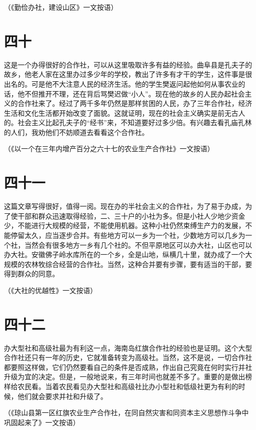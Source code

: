 （《勤俭办社，建设山区》一文按语）

\section*{四十}

这是一个办得很好的合作社，可以从这里吸取许多有益的经验。曲阜县是孔夫子的故乡，他老人家在这里办过多少年的学校，教出了许多有才干的学生，这件事是很出名的。可是他不大注意人民的经济生活。他的学生樊返问起他如何从事农业的话，他不但推开不理，还在背后骂樊迟做“小人”。现在他的故乡的人民办起社会主义的合作社来了。经过了两千多年仍然是那样贫困的人民，办了三年合作社，经济生活和文化生活都开始改变了面貌。这就证明，现在的社会主义确实是前无古人的。社会主义比起孔夫子的“经书”来，不知道要好过多少倍。有兴趣去看孔庙孔林的人们，我劝他们不妨顺道去看看这个合作社。


（《以一个在三年内增产百分之六十七的农业生产合作社》一文按语）

\section*{四十一}

这篇文章写得很好，值得一阅。现在办的半社会主义的合作社，为了易于办成，为了使干部和群众迅速取得经验，二、三十户的小社为多。但是小社人少地少资金少，不能进行大规模的经营，不能使用机器。这种小社仍然束缚生产力的发展，不能停留太久，应当逐步合并。有些地方可以一乡为一个社，少数地方可以几乡为一个社，当然会有很多地方一乡有几个社的。不但平原地区可以办大社，山区也可以办大社。安徽佛子岭水库所在的一个乡，全是山地，纵横几十里，就办成了一个大规模的农林牧综合经营的合作社。当然，这种合并要有步骤，要有适当的干部，要得到群众的同意。


（《大社的优越性》一文按语）

\section*{四十二}

办大型社和高级社最为有利这一点，海南岛红旗合作社的经验也是证明。这个大型合作社还只有一年的历史，它就准备转变为高级社。当然，这不是说，一切合作社都要照这样做，它们仍然要看自己的条件是否成熟，作出自己究竟在何时实行并社升级为宜的决定。但是，一般地说来，有三年时间也就差不多了。重要的是做出榜样给农民看。当着农民看见办大型社和高级社比办小型社和低级社更为有利的时候，他们就会要求并社和升级了。


（《琼山县第一区红旗农业生产合作社，在同自然灾害和同资本主义思想作斗争中巩固起来了》一文按语）

